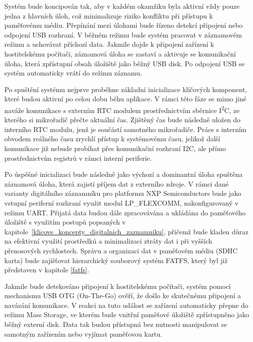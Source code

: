 Systém bude koncipován tak, aby v každém okamžiku byla aktivní vždy pouze jedna z hlavních úloh, což minimalizuje riziko konfliktu při přístupu k paměťovému médiu. Přepínání mezi úlohami bude řízeno detekcí připojení nebo odpojení USB rozhraní. V běžném režimu bude systém pracovat v záznamovém režimu a uchovávat příchozí data. Jakmile dojde k připojení zařízení k hostitelskému počítači, záznamová úloha se zastaví a aktivuje se komunikační úloha, která zpřístupní obsah úložiště jako běžný USB disk. Po odpojení USB se systém automaticky vrátí do režimu záznamu.

Po spuštění systému nejprve proběhne základní inicializace klíčových komponent, které budou aktivní po celou dobu běhu aplikace. V rámci této fáze se mimo jiné naváže komunikace s externím RTC modulem prostřednictvím sběrnice I\textsuperscript{2}C, ze kterého si mikrořadič přečte aktuální čas. Zjištěný čas bude následně uložen do interního RTC modulu, jenž je součástí samotného mikrořadiče. Práce s interním obvodem reálného času zrychlí přístup k systémovému času, jelikož další komunikace již nebude probíhat přes komunikační rozhraní I2C, ale přímo prostřednictvím registrů v rámci interní periferie.

Po úspěšné inicializaci bude následně jako výchozí a dominantní úloha spuštěna záznamová úloha, která zajistí příjem dat z externího zdroje. V rámci dané varianty digitálního záznamníku pro platformu NXP Semiconductors bude jako vstupní periferní rozhraní využit modul LP\_FLEXCOMM, nakonfigurovaný v režimu UART. Přijatá data budou dále zpracovávána a ukládána do paměťového úložiště s využitím postupů popsaných v kapitole~\ref{klicove_koncepty_digitalnich_zaznamniku}, přičemž bude kladen důraz na efektivní využití prostředků a minimalizaci ztráty dat i při vyšších přenosových rychlostech. Správu a organizaci dat v paměťovém médiu (SDHC karta) bude zajišťovat hierarchický souborový systém FATFS, který byl již představen v kapitole \ref{fatfs}.

Jakmile bude detekováno připojení k hostitelskému počítači, systém pomocí mechanismu USB OTG (On-The-Go) ověří, že došlo ke skutečnému připojení a navázání komunikace. V reakci na tuto událost se zařízení automaticky přepne do režimu Mass Storage, ve kterém bude vnitřní paměťové úložiště zpřístupněno jako běžný externí disk. Data tak budou přístupná bez nutnosti manipulovat se samotným zařízením nebo vyjímat paměťovou kartu.

